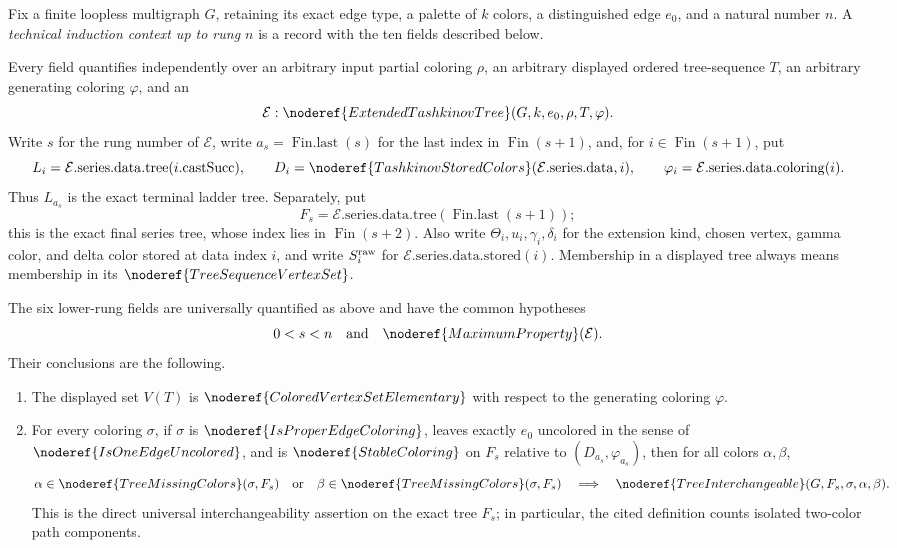 \begin{definition}
Fix a finite loopless multigraph \(G\), retaining its exact edge type, a
palette of \(k\) colors, a distinguished edge \(e_0\), and a natural number
\(n\).  A \emph{technical induction context up to rung \(n\)} is a record
with the ten fields described below.

Every field quantifies independently over an arbitrary input partial
coloring \(\rho\), an arbitrary displayed ordered tree-sequence \(T\), an
arbitrary generating coloring \(\varphi\), and an
\[
  \mathcal E:\noderef{ExtendedTashkinovTree}(G,k,e_0,\rho,T,\varphi).
\]
Write \(s\) for the rung number of \(\mathcal E\), write
\(a_s=\operatorname{Fin.last}(s)\) for the last index in
\(\operatorname{Fin}(s+1)\), and, for \(i\in\operatorname{Fin}(s+1)\), put
\[
 L_i=\mathcal E.\mathrm{series.data.tree}(i.\mathrm{castSucc}),\qquad
 D_i=\noderef{TashkinovStoredColors}(\mathcal E.\mathrm{series.data},i),
 \qquad \varphi_i=\mathcal E.\mathrm{series.data.coloring}(i).
\]
Thus \(L_{a_s}\) is the exact terminal ladder tree.  Separately, put
\[
 F_s=\mathcal E.\mathrm{series.data.tree}
       (\operatorname{Fin.last}(s+1));
\]
this is the exact final series tree, whose index lies in
\(\operatorname{Fin}(s+2)\).  Also write \(\Theta_i,u_i,\gamma_i,\delta_i\)
for the extension kind, chosen vertex, gamma color, and delta color stored
at data index \(i\), and write \(S_i^{\rm raw}\) for
\(\mathcal E.\mathrm{series.data.stored}(i)\).  Membership in a displayed
tree always means membership in its
\(\noderef{TreeSequenceVertexSet}\).

The six lower-rung fields are universally quantified as above and have the
common hypotheses
\[
  0<s<n \quad\hbox{and}\quad \noderef{MaximumProperty}(\mathcal E).
\]
Their conclusions are the following.

\begin{enumerate}
\item[\texttt{lowerOne}.]
The displayed set \(V(T)\) is
\(\noderef{ColoredVertexSetElementary}\) with respect to the generating
coloring \(\varphi\).

\item[\texttt{lowerTwo}.]
For every coloring \(\sigma\), if \(\sigma\) is
\(\noderef{IsProperEdgeColoring}\), leaves exactly \(e_0\) uncolored in the
sense of \(\noderef{IsOneEdgeUncolored}\), and is
\(\noderef{StableColoring}\) on \(F_s\) relative to
\((D_{a_s},\varphi_{a_s})\), then for all colors \(\alpha,\beta\),
\[
 \alpha\in\noderef{TreeMissingColors}(\sigma,F_s)
 \quad\hbox{or}\quad
 \beta\in\noderef{TreeMissingColors}(\sigma,F_s)
 \quad\Longrightarrow\quad
 \noderef{TreeInterchangeable}(G,F_s,\sigma,\alpha,\beta).
\]
This is the direct universal interchangeability assertion on the exact
tree \(F_s\); in particular, the cited definition counts isolated
two-color path components.


\end{enumerate}
\end{definition}
